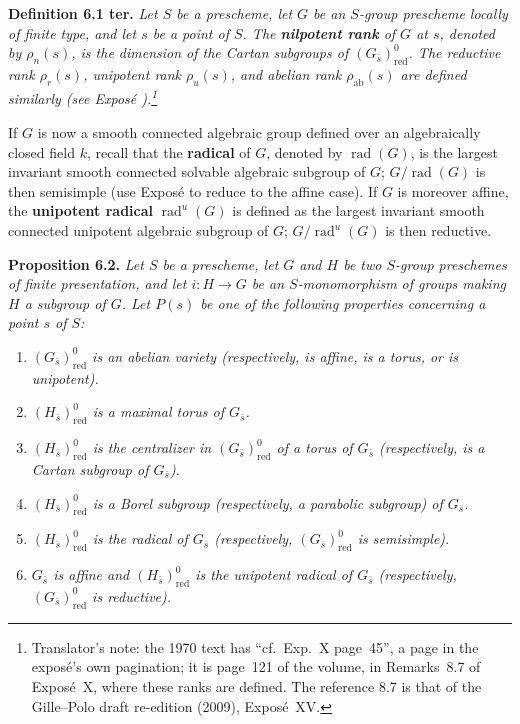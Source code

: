 \textbf{Definition 6.1 ter.} \emph{Let \(S\) be a prescheme, let
\(G\) be an \(S\)-group prescheme locally of finite type, and let
\(s\) be a point of \(S\). The \textbf{nilpotent rank} of \(G\) at
\(s\), denoted by \(\rho_n(s)\), is the dimension of the Cartan
subgroups of \((G_{\bar s})^0_{\mathrm{red}}\). The reductive rank
\(\rho_r(s)\), unipotent rank \(\rho_u(s)\), and abelian rank
\(\rho_{\mathrm{ab}}(s)\) are defined similarly (see Exposé
).\footnote{Translator's note: the 1970 text has ``cf.\ Exp.~X page~45'', a page in the exposé's own pagination; it is page~121 of the volume, in Remarks~8.7 of Exposé~X, where these ranks are defined. The reference 8.7 is that of the Gille--Polo draft re-edition (2009), Exposé~XV.}}

If \(G\) is now a smooth connected algebraic group defined over an
algebraically closed field \(k\), recall that the \textbf{radical}
of \(G\), denoted by \(\operatorname{rad}(G)\), is the largest
invariant smooth connected solvable algebraic subgroup of \(G\);
\(G/\operatorname{rad}(G)\) is then semisimple (use Exposé 
to reduce to the affine case). If \(G\) is moreover affine, the
\textbf{unipotent radical} \(\operatorname{rad}^{u}(G)\) is defined
as the largest invariant smooth connected unipotent algebraic
subgroup of \(G\); \(G/\operatorname{rad}^{u}(G)\) is then
reductive.

\textbf{Proposition 6.2.} \emph{Let \(S\) be a prescheme, let \(G\)
and \(H\) be two \(S\)-group preschemes of finite presentation, and
let \(i:H\to G\) be an \(S\)-monomorphism of groups making \(H\) a subgroup
of \(G\). Let \(P(s)\) be one of the following properties concerning
a point \(s\) of \(S\):}

\begin{enumerate}
\renewcommand{\labelenumi}{\textup{\roman{enumi})}}
\item \emph{\((G_{\bar s})^{0}_{\mathrm{red}}\) is an abelian
variety (respectively, is affine, is a torus, or is unipotent).}
\item \emph{\((H_{\bar s})^{0}_{\mathrm{red}}\) is a maximal torus
of \(G_{\bar s}\).}
\item{} \emph{\((H_{\bar s})^{0}_{\mathrm{red}}\) is the centralizer
in \((G_{\bar s})^{0}_{\mathrm{red}}\) of a torus of \(G_{\bar s}\)
(respectively, is a Cartan subgroup of \(G_{\bar s}\)).}
\item \emph{\((H_{\bar s})^{0}_{\mathrm{red}}\) is a Borel subgroup
(respectively, a parabolic subgroup) of \(G_{\bar s}\).}
\item \emph{\((H_{\bar s})^{0}_{\mathrm{red}}\) is the radical of
\(G_{\bar s}\) (respectively,
\((G_{\bar s})^{0}_{\mathrm{red}}\) is semisimple).}
\item \emph{\(G_{\bar s}\) is affine and
\((H_{\bar s})^{0}_{\mathrm{red}}\) is the unipotent radical of
\(G_{\bar s}\) (respectively,
\((G_{\bar s})^{0}_{\mathrm{red}}\) is reductive).}
\end{enumerate}

